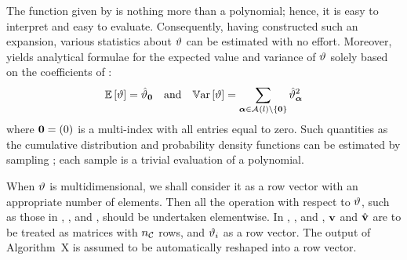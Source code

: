The function given by  is nothing more than a polynomial; hence, it is easy to interpret and easy to evaluate.
Consequently, having constructed such an expansion, various statistics about $\vartheta$ can be estimated with no effort.
Moreover,  yields analytical formulae for the expected value and variance of $\vartheta$ solely based on the coefficients of :
\begin{equation} \elab{probabilistic-moments}
  \expectation{\w} = \coefficient{\w}_\vZero \hspace{1em} \text{and} \hspace{1em} \variance{\w} = \sum_{\multiindex \in \multiindexSet{\level} \setminus \{ \vZero \}} \coefficient{\w}_{\multiindex}^2
\end{equation}
where $\mathbf{0} = (0)$ is a multi-index with all entries equal to zero.
Such quantities as the cumulative distribution and probability density functions can be estimated by sampling ; each sample is a trivial evaluation of a polynomial.

\begin{remark} 
When $\vartheta$ is multidimensional, we shall consider it as a row vector with an appropriate number of elements.
Then all the operation with respect to $\vartheta$, such as those in , , and , should be undertaken elementwise.
In , , and , $\mathbf{v}$ and $\hat{\mathbf{v}}$ are to be treated as matrices with ${n_\mathcal{C}}$ rows, and $\vartheta_i$ as a row vector.
The output of Algorithm~X is assumed to be automatically reshaped into a row vector.
\end{remark}
